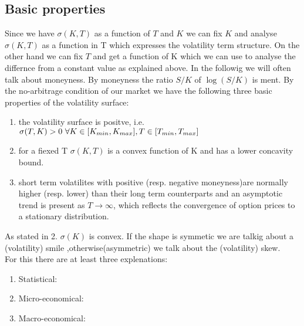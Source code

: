 \documentclass[12pt]{article}
\begin{document}
\subsection{Basic properties}
Since we have $\sigma(K,T)$ as a function of $T$ and $K$ we can fix $K$ and analyse $\sigma(K,T)$ as a function in T which expresses the volatility term structure. On the other hand we can fix $T$ and get a function of K which we can use to analyse the differnce from a constant value as explained above. In the followig we will often talk about moneyness. By moneyness the ratio $S/K$ of $\log(S/K)$ is ment.
By the no-arbitrage condition of our market we have the following three basic properties of the volatility surface:
\begin{enumerate}
\item the volatility surface is positve, i.e. $\sigma(T,K)>0 ~\forall K \in [K_{min},K_{max}],\\T \in [T_{min},T_{max}]$
\item for a fiexed T $\sigma(K,T)$ is a convex function of K and has a lower concavity bound.
\item short term volatilites with positive (resp. negative moneyness)are normally higher (resp. lower) than their long term counterparts and an asymptotic trend is present as $T \rightarrow \infty$, which reflects the convergence of option prices to a stationary distribution.
\end{enumerate}
As stated in 2. $\sigma(K)$ is convex. If the shape is symmetic we are talkig about a (volatility) smile ,otherwise(asymmetric) we talk about the (volatility) skew.\\
For this there are at least three explenations:
\begin{enumerate}
\item Statistical:
\item Micro-economical:
\item Macro-economical:
\end{enumerate}
\end{document}
